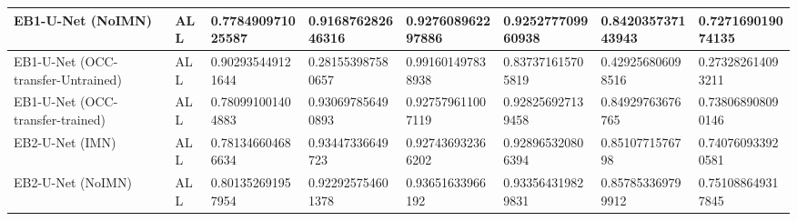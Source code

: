 \documentclass[11pt, a4paper, twoside]{report}
\begin{document}
\begin{landscape}
\begin{table}[H]
{\begin{minipage}{\textwidth}
\begin{tabular}{|l|l|l|l|l|l|l|l|}
        EB1-U-Net (NoIMN) & ALL & 0.778490971025587 & 0.916876282646316 & 0.927608962297886 & 0.925277709960938 & 0.842035737143943 & 0.727169019074135 \\ \hline
        EB1-U-Net (OCC-transfer-Untrained) & ALL & 0.902935449121644 & 0.281553987580657 & 0.991601497838938 & 0.837371615705819 & 0.429256806098516 & 0.273282614093211 \\ \hline
        EB1-U-Net (OCC-transfer-trained) & ALL & 0.780991001404883 & 0.930697856490893 & 0.927579611007119 & 0.928256927139458 & 0.84929763676765 & 0.738068908090146 \\ \hline
        EB2-U-Net (IMN) & ALL & 0.781346604686634 & 0.93447336649723 & 0.927436932366202 & 0.928965320806394 & 0.8510771576798 & 0.740760933920581 \\ \hline
        EB2-U-Net (NoIMN) & ALL & 0.801352691957954 & 0.922925754601378 & 0.93651633966192 & 0.933564319829831 & 0.857853369799912 & 0.751088649317845 \\ \hline
    \end{tabular}
  \end{minipage}}
  \label{app:mean_data}
\end{table}
\end{landscape}
\end{document}
